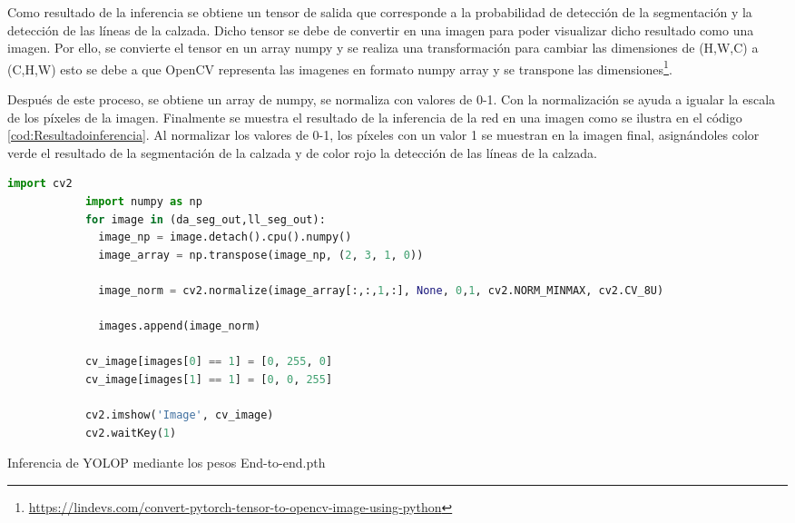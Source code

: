         Como resultado de la inferencia se obtiene un tensor de salida que corresponde a la probabilidad de detección de la segmentación
        y la detección de las líneas de la calzada. Dicho tensor se debe de convertir en una imagen para poder visualizar
        dicho resultado como una imagen. 
        Por ello, se convierte el tensor en un array numpy y se realiza una transformación para cambiar las dimensiones de (H,W,C) 
        a (C,H,W) esto se debe a que OpenCV representa las imagenes en formato numpy array y se transpone las dimensiones\footnote{\url{https://lindevs.com/convert-pytorch-tensor-to-opencv-image-using-python}}. 
    
        Después de este proceso, se obtiene un array de numpy, se normaliza con valores de 0-1. Con la normalización 
        se ayuda a igualar la escala de los píxeles de la imagen. Finalmente se muestra el resultado de la inferencia de la red 
        en una imagen como se ilustra en el código \ref{cod:Resultadoinferencia}. Al normalizar los valores de 0-1, los píxeles con un valor 1 se muestran en la imagen final, asignándoles 
        color verde el resultado de la segmentación de la calzada y de color rojo la detección de las líneas de la calzada. \newline
    
        \begin{code}[H]
          \begin{lstlisting}[language=Python]
            import cv2
            import numpy as np
            for image in (da_seg_out,ll_seg_out):
              image_np = image.detach().cpu().numpy()
              image_array = np.transpose(image_np, (2, 3, 1, 0))
    
              image_norm = cv2.normalize(image_array[:,:,1,:], None, 0,1, cv2.NORM_MINMAX, cv2.CV_8U)
    
              images.append(image_norm)
    
            cv_image[images[0] == 1] = [0, 255, 0]
            cv_image[images[1] == 1] = [0, 0, 255]
    
            cv2.imshow('Image', cv_image)
            cv2.waitKey(1)
          \end{lstlisting}
          \caption[Resultado de la inferencia del modelo YOLOP]{Inferencia de YOLOP mediante los pesos End-to-end.pth}
          \label{cod:Resultadoinferencia}
          \end{code}  


